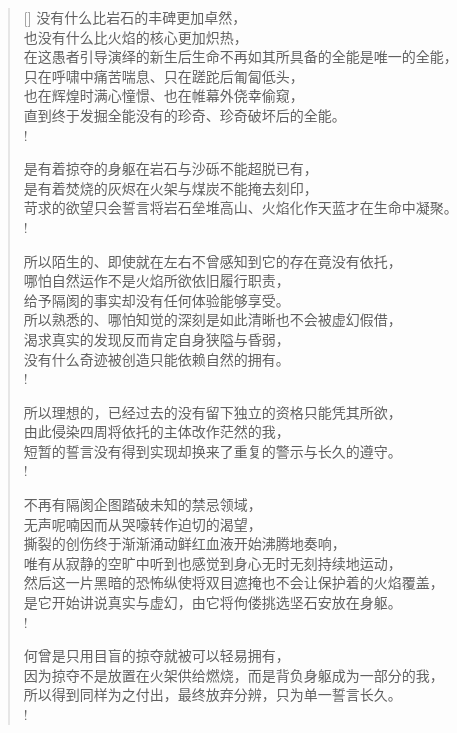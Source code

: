 \documentclass[UTF8, 12pt, a4paper]{ctexrep} %
\begin{document}
\begin{verse}[\versewidth]
没有什么比岩石的丰碑更加卓然，\\
也没有什么比火焰的核心更加炽热，\\
在这愚者引导演绎的新生后生命不再如其所具备的全能是唯一的全能，\\
只在呼啸中痛苦喘息、只在蹉跎后匍匐低头，\\
也在辉煌时满心憧憬、也在帷幕外侥幸偷窥，\\
直到终于发掘全能没有的珍奇、珍奇破坏后的全能。\\!

是有着掠夺的身躯在岩石与沙砾不能超脱已有，\\
是有着焚烧的灰烬在火架与煤炭不能掩去刻印，\\
苛求的欲望只会誓言将岩石垒堆高山、火焰化作天蓝才在生命中凝聚。\\!

所以陌生的、即使就在左右不曾感知到它的存在竟没有依托，\\
哪怕自然运作不是火焰所欲依旧履行职责，\\
给予隔阂的事实却没有任何体验能够享受。\\
所以熟悉的、哪怕知觉的深刻是如此清晰也不会被虚幻假借，\\
渴求真实的发现反而肯定自身狭隘与昏弱，\\
没有什么奇迹被创造只能依赖自然的拥有。\\!

所以理想的，已经过去的没有留下独立的资格只能凭其所欲，\\
由此侵染四周将依托的主体改作茫然的我，\\
短暂的誓言没有得到实现却换来了重复的警示与长久的遵守。\\!

不再有隔阂企图踏破未知的禁忌领域，\\
无声呢喃因而从哭嚎转作迫切的渴望，\\
撕裂的创伤终于渐渐涌动鲜红血液开始沸腾地奏响，\\
唯有从寂静的空旷中听到也感觉到身心无时无刻持续地运动，\\
然后这一片黑暗的恐怖纵使将双目遮掩也不会让保护着的火焰覆盖，\\
是它开始讲说真实与虚幻，由它将佝偻挑选坚石安放在身躯。\\!

何曾是只用目盲的掠夺就被可以轻易拥有，\\
因为掠夺不是放置在火架供给燃烧，而是背负身躯成为一部分的我，\\
所以得到同样为之付出，最终放弃分辨，只为单一誓言长久。\\!


\end{verse}
\end{document}
